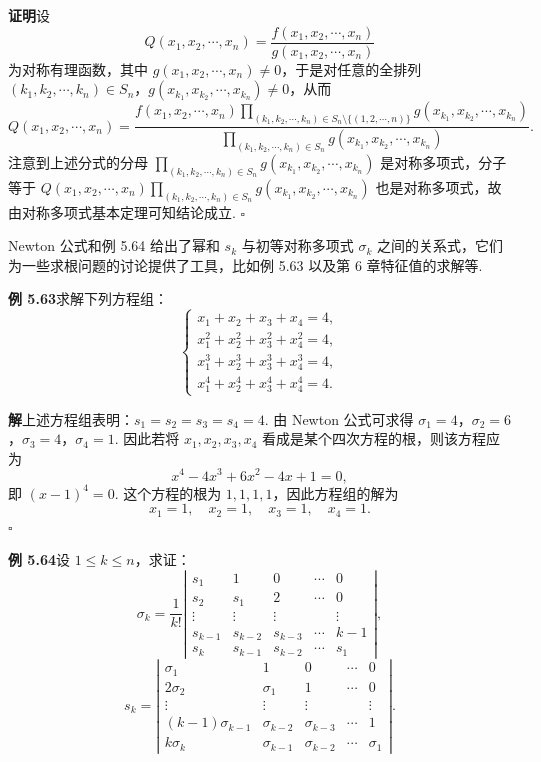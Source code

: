 \documentclass[UTF8,12pt,a4paper,fontset=fandol]{ctexart}
\begin{document}
\noindent\textbf{证明}\quad 设
\[
Q(x_1,x_2,\cdots,x_n)=\frac{f(x_1,x_2,\cdots,x_n)}{g(x_1,x_2,\cdots,x_n)}
\]
为对称有理函数，其中 $g(x_1,x_2,\cdots,x_n)\ne0$，于是对任意的全排列 $(k_1,k_2,\cdots,k_n)\in S_n$，$g(x_{k_1},x_{k_2},\cdots,x_{k_n})\ne0$，从而
\[
Q(x_1,x_2,\cdots,x_n)=
\frac{
f(x_1,x_2,\cdots,x_n)\displaystyle\prod_{(k_1,k_2,\cdots,k_n)\in S_n\setminus\{(1,2,\cdots,n)\}}g(x_{k_1},x_{k_2},\cdots,x_{k_n})
}{
\displaystyle\prod_{(k_1,k_2,\cdots,k_n)\in S_n}g(x_{k_1},x_{k_2},\cdots,x_{k_n})
}.
\]
注意到上述分式的分母 $\displaystyle\prod_{(k_1,k_2,\cdots,k_n)\in S_n}g(x_{k_1},x_{k_2},\cdots,x_{k_n})$ 是对称多项式，分子等于 $Q(x_1,x_2,\cdots,x_n)\displaystyle\prod_{(k_1,k_2,\cdots,k_n)\in S_n}g(x_{k_1},x_{k_2},\cdots,x_{k_n})$ 也是对称多项式，故由对称多项式基本定理可知结论成立. \hfill $\square$

Newton 公式和例 5.64 给出了幂和 $s_k$ 与初等对称多项式 $\sigma_k$ 之间的关系式，它们为一些求根问题的讨论提供了工具，比如例 5.63 以及第 6 章特征值的求解等.

\noindent\textbf{例 5.63}\quad 求解下列方程组：
\[
\left\{
\begin{array}{l}
x_1+x_2+x_3+x_4=4,\\
x_1^2+x_2^2+x_3^2+x_4^2=4,\\
x_1^3+x_2^3+x_3^3+x_4^3=4,\\
x_1^4+x_2^4+x_3^4+x_4^4=4.
\end{array}
\right.
\]

\noindent\textbf{解}\quad 上述方程组表明：$s_1=s_2=s_3=s_4=4$. 由 Newton 公式可求得 $\sigma_1=4$，$\sigma_2=6$，$\sigma_3=4$，$\sigma_4=1$. 因此若将 $x_1,x_2,x_3,x_4$ 看成是某个四次方程的根，则该方程应为
\[
x^4-4x^3+6x^2-4x+1=0,
\]
即 $(x-1)^4=0$. 这个方程的根为 $1,1,1,1$，因此方程组的解为
\[
x_1=1,\quad x_2=1,\quad x_3=1,\quad x_4=1.
\]
\hfill $\square$

\noindent\textbf{例 5.64}\quad 设 $1\le k\le n$，求证：
\[
\sigma_k=\frac1{k!}
\left|\begin{array}{ccccc}
s_1 & 1 & 0 & \cdots & 0\\
s_2 & s_1 & 2 & \cdots & 0\\
\vdots & \vdots & \vdots &        & \vdots\\
s_{k-1} & s_{k-2} & s_{k-3} & \cdots & k-1\\
s_k & s_{k-1} & s_{k-2} & \cdots & s_1
\end{array}\right|,
\]
\[
s_k=
\left|\begin{array}{ccccc}
\sigma_1 & 1 & 0 & \cdots & 0\\
2\sigma_2 & \sigma_1 & 1 & \cdots & 0\\
\vdots & \vdots & \vdots &        & \vdots\\
(k-1)\sigma_{k-1} & \sigma_{k-2} & \sigma_{k-3} & \cdots & 1\\
k\sigma_k & \sigma_{k-1} & \sigma_{k-2} & \cdots & \sigma_1
\end{array}\right|.
\]
\end{document}
